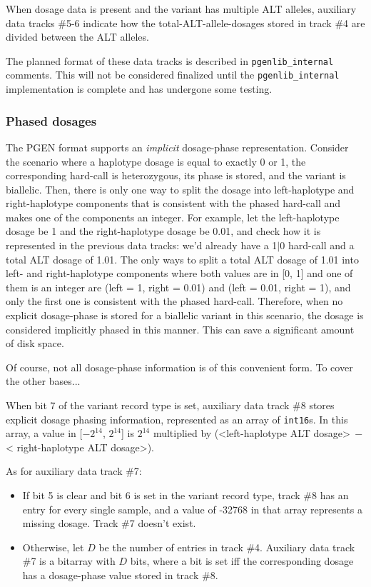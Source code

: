 \documentclass[8pt]{article}
\begin{document}
When dosage data is present and the variant has multiple ALT alleles, auxiliary
data tracks \#5-6 indicate how the total-ALT-allele-dosages stored in track \#4
are divided between the ALT alleles.

The planned format of these data tracks is described in
\texttt{pgenlib\_internal} comments.  This will not be considered finalized
until the \texttt{pgenlib\_internal} implementation is complete and has
undergone some testing.

\subsubsection{Phased dosages}

The PGEN format supports an \textit{implicit} dosage-phase representation.
Consider the scenario where a haplotype dosage is equal to exactly 0 or 1, the
corresponding hard-call is heterozygous, its phase is stored, and the variant
is biallelic.  Then, there is only one way to split the dosage into
left-haplotype and right-haplotype components that is consistent with the
phased hard-call and makes one of the components an integer.  For example, let
the left-haplotype dosage be 1 and the right-haplotype dosage be 0.01, and
check how it is represented in the previous data tracks: we'd already have a
1$|$0 hard-call and a total ALT dosage of 1.01.  The only ways to split a total
ALT dosage of 1.01 into left- and right-haplotype components where both values
are in [0, 1] and one of them is an integer are (left = 1, right = 0.01) and
(left = 0.01, right = 1), and only the first one is consistent with the phased
hard-call.  Therefore, when no explicit dosage-phase is stored for a biallelic
variant in this scenario, the dosage is considered implicitly phased in this
manner.  This can save a significant amount of disk space.

Of course, not all dosage-phase information is of this convenient form.  To
cover the other bases...

When bit 7 of the variant record type is set, auxiliary data track \#8 stores
explicit dosage phasing information, represented as an array of
\texttt{int16}s.  In this array, a value in [$-2^{14}$, $2^{14}$] is $2^{14}$
multiplied by (\textless left-haplotype ALT dosage\textgreater $\>-$ \textless
right-haplotype ALT dosage\textgreater ).

As for auxiliary data track \#7:

\begin{itemize}
\item If bit 5 is clear and bit 6 is set in the variant record type, track \#8
  has an entry for every single sample, and a value of -32768 in that array
  represents a missing dosage.  Track \#7 doesn't exist.
\item Otherwise, let $D$ be the number of entries in track \#4.  Auxiliary data
  track \#7 is a bitarray with $D$ bits, where a bit is set iff the
  corresponding dosage has a dosage-phase value stored in track \#8.
\end{itemize}
\end{document}
